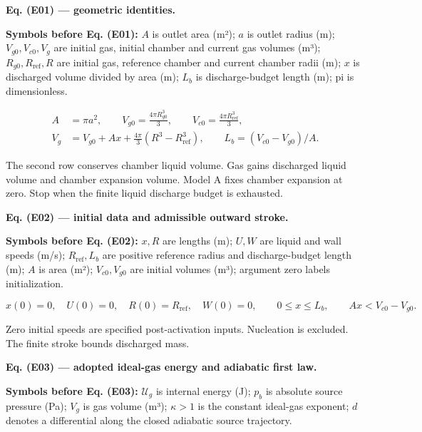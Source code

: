 \documentclass[11pt]{article}
\begin{document}
\textbf{Eq. (E01) — geometric identities.}


\textbf{Symbols before Eq. (E01):} \(A\) is outlet area (m²); \(a\) is outlet radius (m); \(V_{g0},V_{c0},V_g\) are initial gas, initial chamber and current gas volumes (m³); \(R_{g0},R_{\mathrm{ref}},R\) are initial gas, reference chamber and current chamber radii (m); \(x\) is discharged volume divided by area (m); \(L_b\) is discharge-budget length (m); pi is dimensionless.



\begin{equation*}
\begin{aligned}
A&=\pi a^2,\qquad V_{g0}=\frac{4\pi R_{g0}^3}{3},\qquad V_{c0}=\frac{4\pi R_{\mathrm{ref}}^3}{3},\\
V_g&=V_{g0}+Ax+\frac{4\pi}{3}(R^3-R_{\mathrm{ref}}^3),\qquad L_b=(V_{c0}-V_{g0})/A.
\end{aligned}
\end{equation*}

The second row conserves chamber liquid volume. Gas gains discharged liquid volume and chamber expansion volume. Model A fixes chamber expansion at zero. Stop when the finite liquid discharge budget is exhausted.


\textbf{Eq. (E02) — initial data and admissible outward stroke.}


\textbf{Symbols before Eq. (E02):} \(x,R\) are lengths (m); \(U,W\) are liquid and wall speeds (m/s); \(R_{\mathrm{ref}},L_b\) are positive reference radius and discharge-budget length (m); \(A\) is area (m²); \(V_{c0},V_{g0}\) are initial volumes (m³); argument zero labels initialization.



\begin{equation*}
x(0)=0,\quad U(0)=0,\quad R(0)=R_{\mathrm{ref}},\quad W(0)=0,
\qquad 0\le x\le L_b,\qquad Ax<V_{c0}-V_{g0}.
\end{equation*}

Zero initial speeds are specified post-activation inputs. Nucleation is excluded. The finite stroke bounds discharged mass.


\textbf{Eq. (E03) — adopted ideal-gas energy and adiabatic first law.}


\textbf{Symbols before Eq. (E03):} \(\mathcal U_g\) is internal energy (J); \(p_b\) is absolute source pressure (Pa); \(V_g\) is gas volume (m³); \(\kappa>1\) is the constant ideal-gas exponent; \(d\) denotes a differential along the closed adiabatic source trajectory.
\end{document}
